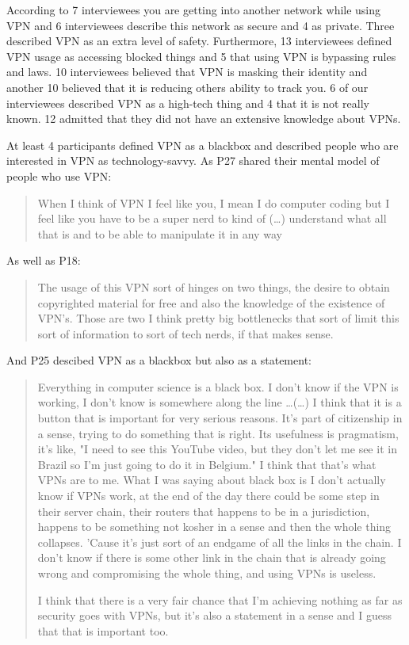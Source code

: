 According to 7 interviewees you are getting into another network while using VPN and 6 interviewees describe this network as secure and 4 as private. 
Three described VPN as an extra level of safety. Furthermore, 13 interviewees defined VPN usage as accessing blocked things and 5 that using VPN is bypassing rules and laws. 10 interviewees believed that VPN is masking their identity and another 10 believed that it is reducing others ability to track you.  6 of our interviewees described VPN as a high-tech thing and 4 that it is not really known. 12 admitted that they did not have an extensive knowledge about VPNs.

At least 4 participants defined VPN as a blackbox and described people who are interested in VPN as technology-savvy. As P27 shared their mental model of people who use VPN: 
\begin{quote}When I think of VPN I feel like you, I mean I do computer coding but I feel like you have to be a super nerd to kind of (\dots) understand what all that is and to be able to manipulate it in any way\end{quote}


As well as P18:
\begin{quote}The usage of this VPN sort of hinges on two things, the desire to obtain copyrighted material for free and also the knowledge of the existence of VPN's. Those are two I think pretty big bottlenecks that sort of limit this sort of information to sort of tech nerds, if that makes sense.\end{quote}


And P25 descibed VPN as a blackbox but also as a statement:
\begin{quote}Everything in computer science is a black box. I don't know if the VPN is working, I don't know is somewhere along the line \dots (\dots)
I think that it is a button that is important for very serious reasons. It's part of citizenship in a sense, trying to do something that is right. Its usefulness is pragmatism, it's like, "I need to see this YouTube video, but they don't let me see it in Brazil so I'm just going to do it in Belgium." I think that that's what VPNs are to me. What I was saying about black box is I don't actually know if VPNs work, at the end of the day there could be some step in their server chain, their routers that happens to be in a jurisdiction, happens to be something not kosher in a sense and then the whole thing collapses. 'Cause it's just sort of an endgame of all the links in the chain. I don't know if there is some other link in the chain that is already going wrong and compromising the whole thing, and using VPNs is useless.


I think that there is a very fair chance that I'm achieving nothing as far as security goes with VPNs, but it's also a statement in a sense and I guess that that is important too.\end{quote}

